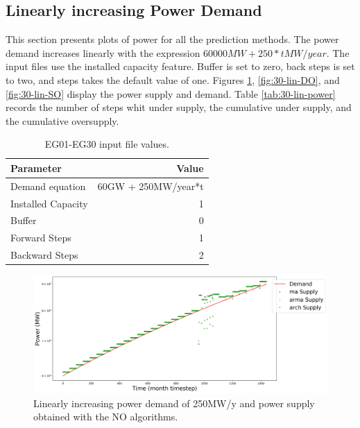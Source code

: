 \documentclass[11pt]{article}
\begin{document}
\subsection{Linearly increasing Power Demand}

This section presents plots of power for all the prediction methods. The power demand increases linearly with the expression $60000 MW + 250*t MW/year$. The input files use the installed capacity feature. Buffer is set to zero, back steps is set to two, and steps takes the default value of one.
Figures \ref{fig:30-lin-NO}, \ref{fig:30-lin-DO}, and \ref{fig:30-lin-SO} display the power supply and demand.
Table \ref{tab:30-lin-power} records the number of steps whit under supply, the cumulative under supply, and the cumulative oversupply.

\begin{table}[H]
	\centering
	\caption{EG01-EG30 input file values.}
	\label{tab:30-inputs}
	\begin{tabularx}{\textwidth}{lR}
		\hline
		Parameter			& Value \\ 	\hline
		Demand equation		& 60GW + 250MW/year*t  \\
		Installed Capacity 	& 1 \\
		Buffer    			& 0 \\
		Forward Steps		& 1 \\
		Backward Steps		& 2 \\		\hline
	\end{tabularx}
\end{table}

\begin{figure}[H]
	\centering
	\includegraphics[width=\textwidth]{30-figures/lin-30-power-buffer01.png} 
	\hfill
	\caption{Linearly increasing power demand of 250MW/y and power supply obtained with the NO algorithms.}
	\label{fig:30-lin-NO}
\end{figure}
\end{document}
